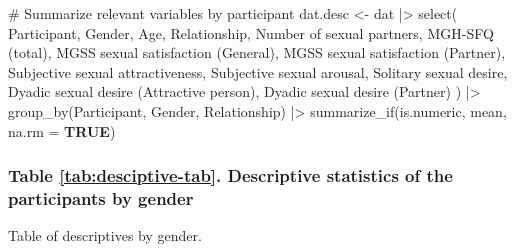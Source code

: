 \documentclass[
  bookmarksnumbered]{article}
\newenvironment{Shaded}{\begin{snugshade}}{\end{snugshade}}
\newcommand{\AttributeTok}[1]{\textcolor[rgb]{0.80,0.80,0.80}{#1}}
\newcommand{\CommentTok}[1]{\textcolor[rgb]{0.50,0.62,0.50}{#1}}
\newcommand{\ConstantTok}[1]{\textcolor[rgb]{0.86,0.64,0.64}{\textbf{#1}}}
\newcommand{\FunctionTok}[1]{\textcolor[rgb]{0.94,0.94,0.56}{#1}}
\newcommand{\NormalTok}[1]{\textcolor[rgb]{0.80,0.80,0.80}{#1}}
\newcommand{\OtherTok}[1]{\textcolor[rgb]{0.94,0.94,0.56}{#1}}
\newcommand{\SpecialCharTok}[1]{\textcolor[rgb]{0.86,0.64,0.64}{#1}}
\newcommand{\StringTok}[1]{\textcolor[rgb]{0.80,0.58,0.58}{#1}}
\begin{document}
\begin{Shaded}
\begin{Highlighting}[]
\CommentTok{\# Summarize relevant variables by participant}
\NormalTok{dat.desc }\OtherTok{\textless{}{-}}\NormalTok{ dat }\SpecialCharTok{|\textgreater{}}
  \FunctionTok{select}\NormalTok{(}
\NormalTok{    Participant, Gender, Age, Relationship, }\StringTok{\textasciigrave{}}\AttributeTok{Number of sexual partners}\StringTok{\textasciigrave{}}\NormalTok{,}
    \StringTok{\textasciigrave{}}\AttributeTok{MGH{-}SFQ (total)}\StringTok{\textasciigrave{}}\NormalTok{,}
    \StringTok{\textasciigrave{}}\AttributeTok{MGSS sexual satisfaction (General)}\StringTok{\textasciigrave{}}\NormalTok{, }\StringTok{\textasciigrave{}}\AttributeTok{MGSS sexual satisfaction (Partner)}\StringTok{\textasciigrave{}}\NormalTok{,}
    \StringTok{\textasciigrave{}}\AttributeTok{Subjective sexual attractiveness}\StringTok{\textasciigrave{}}\NormalTok{, }\StringTok{\textasciigrave{}}\AttributeTok{Subjective sexual arousal}\StringTok{\textasciigrave{}}\NormalTok{,}
    \StringTok{\textasciigrave{}}\AttributeTok{Solitary sexual desire}\StringTok{\textasciigrave{}}\NormalTok{,}
    \StringTok{\textasciigrave{}}\AttributeTok{Dyadic sexual desire (Attractive person)}\StringTok{\textasciigrave{}}\NormalTok{, }\StringTok{\textasciigrave{}}\AttributeTok{Dyadic sexual desire (Partner)}\StringTok{\textasciigrave{}}
\NormalTok{  ) }\SpecialCharTok{|\textgreater{}}
  \FunctionTok{group\_by}\NormalTok{(Participant, Gender, Relationship) }\SpecialCharTok{|\textgreater{}}
  \FunctionTok{summarize\_if}\NormalTok{(is.numeric, mean, }\AttributeTok{na.rm =} \ConstantTok{TRUE}\NormalTok{)}
\end{Highlighting}
\end{Shaded}

\subsubsection{Table \ref{tab:desciptive-tab}. Descriptive statistics of the participants by gender}\label{table-reftabdesciptive-tab.-descriptive-statistics-of-the-participants-by-gender}

Table of descriptives by gender.
\end{document}
